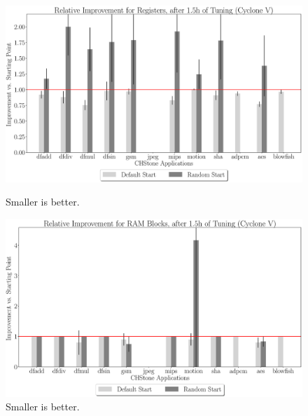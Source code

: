 \documentclass[12pt, a4paper]{article}
\begin{document}
\begin{figure}[htpb]
    \centering
    \begin{minipage}{.48\textwidth}
        \centering
        \includegraphics[width=.8\textwidth]{rel_comp_regs_5400_chstone_CycloneV}
        \caption{Smaller is better.}
    \end{minipage}%
    \begin{minipage}{.48\textwidth}
        \centering
        \includegraphics[width=.8\textwidth]{rel_comp_ram_5400_chstone_CycloneV}
        \caption{Smaller is better.}
    \end{minipage}%


\end{figure}
\end{document}
